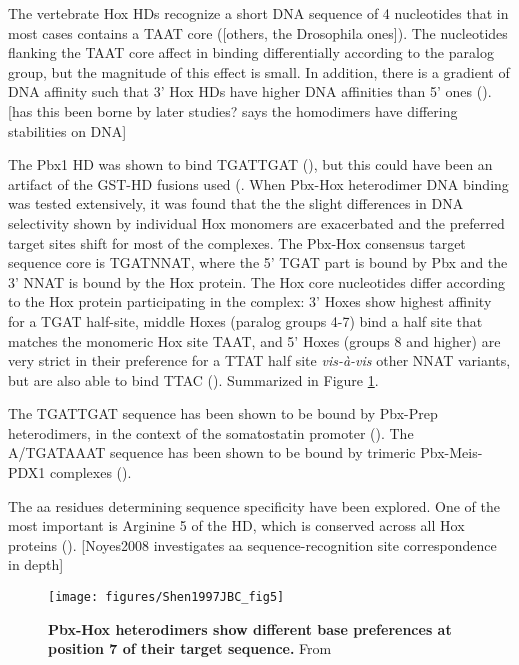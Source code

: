 The vertebrate Hox \acp{HD} recognize a short DNA sequence of 4 nucleotides that in most cases contains a TAAT core (\cite{Treisman1992,Catron1993}[others, the Drosophila ones]). The nucleotides flanking the TAAT core affect in binding differentially according to the paralog group, but the magnitude of this effect is small. In addition, there is a gradient of DNA affinity such that 3' Hox \acp{HD} have higher DNA affinities than 5' ones (\cite{Pellerin1994}). [has this been borne by later studies? \cite{Shen1997a} says the homodimers have differing stabilities on DNA]

The Pbx1 \ac{HD} was shown to bind TGATTGAT (\cite{VanDijk1993}), but this could have been an artifact of the GST-\ac{HD} fusions used (\cite{review que lo decia: Mann and chan 1996?}. When Pbx-Hox heterodimer DNA binding was tested extensively, it was found that the the slight differences in DNA selectivity shown by individual Hox monomers are exacerbated and the preferred target sites shift for most of the complexes. The Pbx-Hox consensus target sequence core is TGATNNAT, where the 5' TGAT part is bound by Pbx and the 3' NNAT is bound by the Hox protein. The Hox core nucleotides differ according to the Hox protein participating in the complex: 3' Hoxes show highest affinity for a TGAT half-site, middle Hoxes (paralog groups 4-7) bind a half site that matches the monomeric Hox site TAAT, and 5' Hoxes (groups 8 and higher) are very strict in their preference for a TTAT half site \textit{vis-à-vis} other NNAT variants, but are also able to bind TTAC (\cite{Chang1996,Chan1997,Shen1997a}). Summarized in Figure \ref{fig:Shen1997JBC_fig5}.

The TGATTGAT sequence has been shown to be bound by Pbx-Prep heterodimers, in the context of the somatostatin promoter (\cite{Goudet1999}). The A/TGATAAAT sequence has been shown to be bound by trimeric Pbx-Meis-PDX1 complexes (\cite{Liu2001}).

The \ac{aa} residues determining sequence specificity have been explored. One of the most important is Arginine 5 of the \ac{HD}, which is conserved across all Hox proteins (\cite{Phelan1997}). [Noyes2008 investigates aa sequence-recognition site correspondence in depth] 


\begin{figure}[]
  
  \centering
  \texttt{[image: figures/Shen1997JBC\_fig5]}
  \caption[Pbx-Hox heterodimers show different base preferences at position 7 of their target sequence]{\textbf{Pbx-Hox heterodimers show different base preferences at position 7 of their target sequence.} From \cite{Shen1997a}}
  \label{fig:Shen1997JBC_fig5}
\end{figure}

